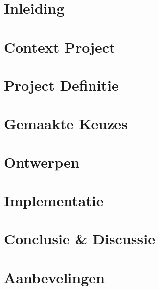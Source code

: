 \documentclass{../local}
\begin{document}
\newpage{}
\renewcommand{\thesection}{\arabic{section}}
\setlength{\cftbeforetoctitleskip}{-3em}
\tableofcontents

\clearpage

\chapter{Inleiding}


\chapter{Context Project} 


\chapter{Project Definitie}



\chapter{Gemaakte Keuzes}


\chapter{Ontwerpen}


\chapter{Implementatie}


\chapter{Conclusie \& Discussie}


\chapter{Aanbevelingen}






\end{document}
